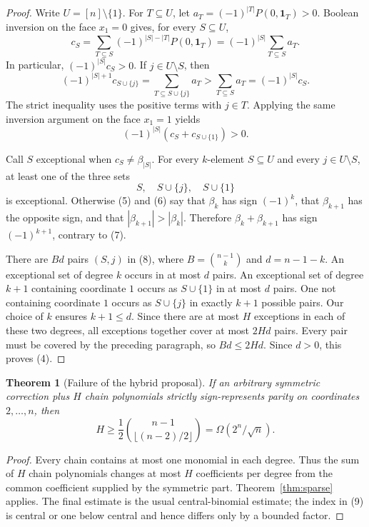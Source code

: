 \documentclass[11pt]{article}
\newtheorem{theorem}{Theorem}
\begin{document}
\begin{proof}
Write $U=[n]\setminus\{1\}$. For $T\subseteq U$, let
$a_T=(-1)^{|T|}P(0,\mathbf1_T)>0$. Boolean inversion on the face
$x_1=0$ gives, for every $S\subseteq U$,
\[
 c_S=\sum_{T\subseteq S}(-1)^{|S|-|T|}P(0,\mathbf1_T)
       =(-1)^{|S|}\sum_{T\subseteq S}a_T.                       \tag{5}
\]
In particular, $(-1)^{|S|}c_S>0$. If $j\in U\setminus S$, then
\[
 (-1)^{|S|+1}c_{S\cup\{j\}}
       =\sum_{T\subseteq S\cup\{j\}}a_T
       >\sum_{T\subseteq S}a_T
       =(-1)^{|S|}c_S.                                         \tag{6}
\]
The strict inequality uses the positive terms with $j\in T$.
Applying the same inversion argument on the face $x_1=1$ yields
\[
              (-1)^{|S|}(c_S+c_{S\cup\{1\}})>0.               \tag{7}
\]

Call $S$ exceptional when $c_S\ne\beta_{|S|}$. For every
$k$-element $S\subseteq U$ and every $j\in U\setminus S$, at
least one of the three sets
\[
                         S,\quad S\cup\{j\},\quad S\cup\{1\}
                                                                    \tag{8}
\]
is exceptional. Otherwise (5) and (6) say that $\beta_k$ has sign
$(-1)^k$, that $\beta_{k+1}$ has the opposite sign, and that
$|\beta_{k+1}|>|\beta_k|$. Therefore
$\beta_k+\beta_{k+1}$ has sign $(-1)^{k+1}$, contrary to (7).

There are $B d$ pairs $(S,j)$ in (8), where
$B=\binom{n-1}{k}$ and $d=n-1-k$. An exceptional set of degree
$k$ occurs in at most $d$ pairs. An exceptional set of degree
$k+1$ containing coordinate $1$ occurs as $S\cup\{1\}$ in at
most $d$ pairs. One not containing coordinate $1$ occurs as
$S\cup\{j\}$ in exactly $k+1$ possible pairs. Our choice of $k$
ensures $k+1\le d$. Since there are at most $H$ exceptions in each
of these two degrees, all exceptions together cover at most $2Hd$
pairs. Every pair must be covered by the preceding paragraph, so
$Bd\le2Hd$. Since $d>0$, this proves (4).
\end{proof}

\begin{theorem}[Failure of the hybrid proposal]
If an arbitrary symmetric correction plus $H$ chain polynomials
strictly sign-represents parity on coordinates $2,\ldots,n$, then
\[
                  H\ge\frac12\binom{n-1}{\lfloor(n-2)/2\rfloor}
                    =\Omega(2^n/\sqrt n).                     \tag{9}
\]
\end{theorem}

\begin{proof}
Every chain contains at most one monomial in each degree. Thus the
sum of $H$ chain polynomials changes at most $H$ coefficients per
degree from the common coefficient supplied by the symmetric part.
Theorem~\ref{thm:sparse} applies. The final estimate is the usual
central-binomial estimate; the index in (9) is central or one below
central and hence differs only by a bounded factor.
\end{proof}
\end{document}
